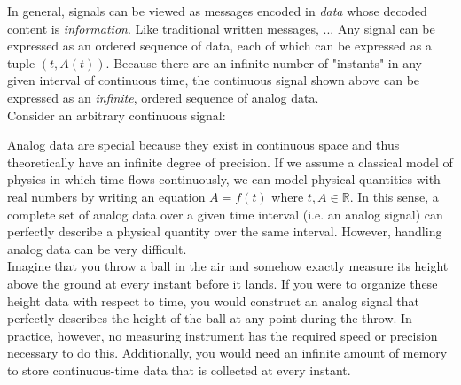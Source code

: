 
In general, signals can be viewed as messages encoded in \textit{data} whose decoded content is \textit{information}. Like traditional written messages, ... Any signal can be expressed as an ordered sequence of data, each of which can be expressed as a tuple $(t,A(t))$. Because there are an infinite number of "instants" in any given interval of continuous time, the continuous signal shown above can be expressed as an \textit{infinite}, ordered sequence of analog data. \\


Consider an arbitrary continuous signal:

\begin{center}
\end{center}

Analog data are special because they exist in continuous space and thus theoretically have an infinite degree of precision. If we assume a classical model of physics in which time flows continuously, we can model physical quantities with real numbers by writing an equation $A=f(t)$ where $t,A\in\mathbb{R}$. In this sense, a complete set of analog data over a given time interval (i.e. an analog signal) can perfectly describe a physical quantity over the same interval. However, handling analog data can be very difficult. \\

Imagine that you throw a ball in the air and somehow exactly measure its height above the ground at every instant before it lands. If you were to organize these height data with respect to time, you would construct an analog signal that perfectly describes the height of the ball at any point during the throw. In practice, however, no measuring instrument has the required speed or precision necessary to do this. Additionally, you would need an infinite amount of memory to store continuous-time data that is collected at every instant. \\

